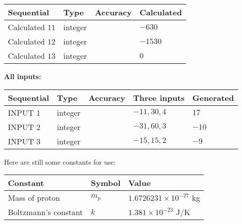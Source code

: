 \documentclass[12pt]{article}
\begin{document}
   
  
  
\noindent\begin{tabular}{|l|l|l|l|}
\hline
 Sequential & Type & Accuracy & Calculated \\ 
\hline
 
 
  Calculated $           11 $ & integer &  & 
  $ -630 $ 
 \\  \hline  
 
 
  Calculated $           12 $ & integer &  & 
  $ -1530 $ 
 \\  \hline  
 
 
  Calculated $           13 $ & integer &  & 
  $ 0 $ 
 \\  \hline  
 \end{tabular}
   
   
   
   
\noindent\vspace{0.1in}\hspace{-0.08in} {\textbf{\Large{All inputs: }}}
   
   
  
  
\noindent\begin{tabular}{|l|l|l|l|l|}
\hline
 Sequential & Type & Accuracy & Three inputs & Generated \\ 
\hline
 
 
  INPUT $            1 $ & integer &  & $
 -11
 , 
 30
 , 
 4
 $ & $ 17 $ 
 \\  \hline  
 
 
  INPUT $            2 $ & integer &  & $
 -31
 , 
 60
 , 
 3
 $ & $ -10 $ 
 \\  \hline  
 
 
  INPUT $            3 $ & integer &  & $
 -15
 , 
 15
 , 
 2
 $ & $ -9 $ 
 \\  \hline  
 \end{tabular}
   
   
   
   
   
   
 \vspace{0.2in}
Here are still some constants for use:
 
 
\noindent\begin{tabular}{|l|l|l|}
\hline
Constant & Symbol & Value \\
\hline
 
Mass of proton &
$m_p$ &
 $ 1.6726231 \times 10^{-27} $
kg \\
\hline
 
Boltzmann's constant &
$k$ &
 $ 1.381 \times 10^{-23} $
J/K \\
\hline
 
\end{tabular}
 
\end{document}
